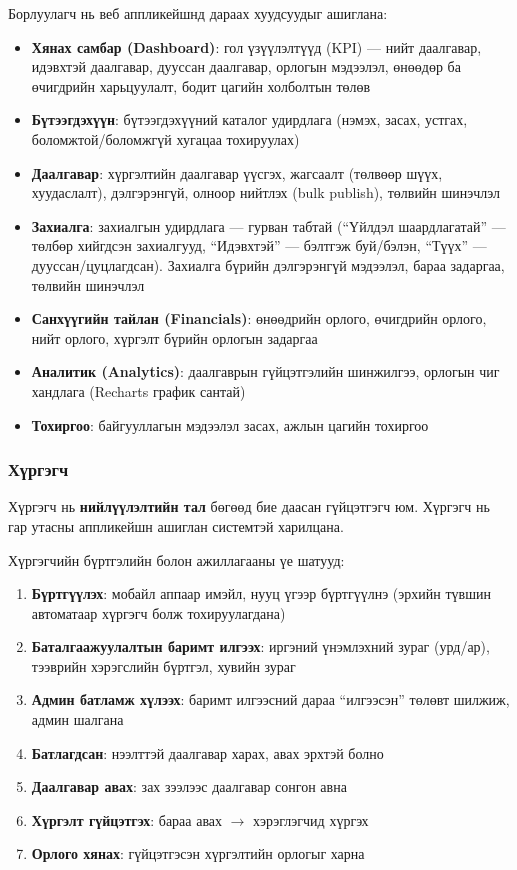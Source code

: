 Борлуулагч нь веб аппликейшнд дараах хуудсуудыг ашиглана:
\begin{itemize}
  \item \textbf{Хянах самбар (Dashboard)}: гол үзүүлэлтүүд (KPI) — нийт даалгавар, идэвхтэй даалгавар, дууссан даалгавар, орлогын мэдээлэл, өнөөдөр ба өчигдрийн харьцуулалт, бодит цагийн холболтын төлөв
  \item \textbf{Бүтээгдэхүүн}: бүтээгдэхүүний каталог удирдлага (нэмэх, засах, устгах, боломжтой/боломжгүй хугацаа тохируулах)
  \item \textbf{Даалгавар}: хүргэлтийн даалгавар үүсгэх, жагсаалт (төлвөөр шүүх, хуудаслалт), дэлгэрэнгүй, олноор нийтлэх (bulk publish), төлвийн шинэчлэл
  \item \textbf{Захиалга}: захиалгын удирдлага — гурван табтай (``Үйлдэл шаардлагатай'' — төлбөр хийгдсэн захиалгууд, ``Идэвхтэй'' — бэлтгэж буй/бэлэн, ``Түүх'' — дууссан/цуцлагдсан). Захиалга бүрийн дэлгэрэнгүй мэдээлэл, бараа задаргаа, төлвийн шинэчлэл
  \item \textbf{Санхүүгийн тайлан (Financials)}: өнөөдрийн орлого, өчигдрийн орлого, нийт орлого, хүргэлт бүрийн орлогын задаргаа
  \item \textbf{Аналитик (Analytics)}: даалгаврын гүйцэтгэлийн шинжилгээ, орлогын чиг хандлага (Recharts график сантай)
  \item \textbf{Тохиргоо}: байгууллагын мэдээлэл засах, ажлын цагийн тохиргоо
\end{itemize}

\subsubsection{Хүргэгч}
Хүргэгч нь \textbf{нийлүүлэлтийн тал} бөгөөд бие даасан гүйцэтгэгч юм. Хүргэгч нь гар утасны аппликейшн ашиглан системтэй харилцана.

Хүргэгчийн бүртгэлийн болон ажиллагааны үе шатууд:
\begin{enumerate}
  \item \textbf{Бүртгүүлэх}: мобайл аппаар имэйл, нууц үгээр бүртгүүлнэ (эрхийн түвшин автоматаар хүргэгч болж тохируулагдана)
  \item \textbf{Баталгаажуулалтын баримт илгээх}: иргэний үнэмлэхний зураг (урд/ар), тээврийн хэрэгслийн бүртгэл, хувийн зураг
  \item \textbf{Админ батламж хүлээх}: баримт илгээсний дараа ``илгээсэн'' төлөвт шилжиж, админ шалгана
  \item \textbf{Батлагдсан}: нээлттэй даалгавар харах, авах эрхтэй болно
  \item \textbf{Даалгавар авах}: зах зээлээс даалгавар сонгон авна
  \item \textbf{Хүргэлт гүйцэтгэх}: бараа авах $\rightarrow$ хэрэглэгчид хүргэх
  \item \textbf{Орлого хянах}: гүйцэтгэсэн хүргэлтийн орлогыг харна
\end{enumerate}

